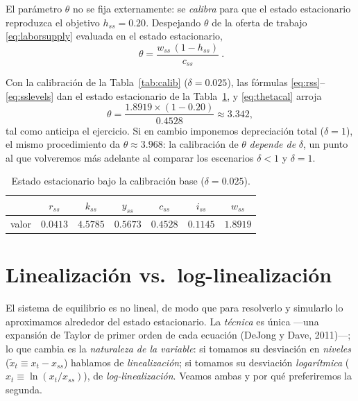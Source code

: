 \documentclass[11pt,a4paper]{report}
\newcounter{tcbex}[section]
\renewcommand{\thetcbex}{\thesection.\arabic{tcbex}}
\newenvironment{example}[1][]{%
  \refstepcounter{tcbex}%
  \begin{tcolorbox}[examplestyle, title={Ejemplo~\thetcbex%
    \ifx\relax#1\relax\else\ (#1)\fi}]}%
{\end{tcolorbox}}
\newcounter{ejer}
\begin{document}
El parámetro $\theta$ no se fija externamente: se \emph{calibra} para que el
estado estacionario reproduzca el objetivo $h_{ss}=0.20$. Despejando $\theta$ de
la oferta de trabajo \eqref{eq:laborsupply} evaluada en el estado estacionario,
\begin{equation}
\boxed{\ \theta=\frac{w_{ss}\,(1-h_{ss})}{c_{ss}}\ }. \label{eq:thetacal}
\end{equation}

\begin{example}[Verificación numérica]
Con la calibración de la Tabla~\ref{tab:calib} ($\delta=0.025$), las fórmulas
\eqref{eq:rss}--\eqref{eq:sslevels} dan el estado estacionario de la
Tabla~\ref{tab:ss}, y \eqref{eq:thetacal} arroja
\[
\theta=\frac{1.8919\times(1-0.20)}{0.4528}\approx 3.342,
\]
tal como anticipa el ejercicio. Si en cambio imponemos depreciación total
($\delta=1$), el mismo procedimiento da $\theta\approx 3.968$: la calibración de
$\theta$ \emph{depende de} $\delta$, un punto al que volveremos más adelante al
comparar los escenarios $\delta<1$ y $\delta=1$.
\end{example}

\begin{table}[H]
\centering\small
\begin{tabular}{lcccccc}
\toprule
 & $r_{ss}$ & $k_{ss}$ & $y_{ss}$ & $c_{ss}$ & $i_{ss}$ & $w_{ss}$ \\
\midrule
valor & $0.0413$ & $4.5785$ & $0.5673$ & $0.4528$ & $0.1145$ & $1.8919$ \\
\bottomrule
\end{tabular}
\caption{Estado estacionario bajo la calibración base ($\delta=0.025$).}
\label{tab:ss}
\end{table}

\section{Linealización vs.\ log-linealización}
\label{sec:loglin}

El sistema de equilibrio es no lineal, de modo que para resolverlo y simularlo lo
aproximamos alrededor del estado estacionario. La \emph{técnica} es única ---una
expansión de Taylor de primer orden de cada ecuación (DeJong y Dave, 2011)---; lo que
cambia es la \emph{naturaleza de la variable}: si tomamos su desviación en
\emph{niveles} ($\tilde{x}_t\equiv x_t-x_{ss}$) hablamos de \emph{linealización}; si
tomamos su desviación \emph{logarítmica} ($\hat{x}_t\equiv\ln(x_t/x_{ss})$), de
\emph{log-linealización}. Veamos ambas y por qué preferiremos la segunda.
\end{document}
